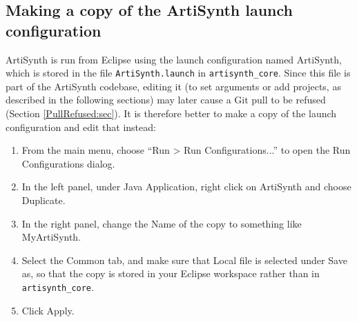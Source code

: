 %
%
%

\subsection{Making a copy of the ArtiSynth launch configuration}
\label{EclipseLaunchCopy}

ArtiSynth is run from Eclipse using the launch configuration named
{\sf ArtiSynth}, which is stored in the file {\tt ArtiSynth.launch}
in {\tt artisynth\_core}. Since this file is part of the ArtiSynth
codebase, editing it (to set arguments or add projects, as described
in the following sections) may later cause a Git pull to be refused
(Section \ref{PullRefused:sec}). It is therefore better to make a copy of
the launch configuration and edit that instead:

\begin{enumerate}

\item From the main menu, choose ``{\sf Run > Run Configurations...}''
to open the {\sf Run Configurations} dialog.

\item In the left panel, under {\sf Java Application}, right click
on {\sf ArtiSynth} and choose {\sf Duplicate}.

\item In the right panel, change the {\sf Name} of the copy to
something like {\sf MyArtiSynth}.

\item Select the {\sf Common} tab, and make sure that {\sf Local
file} is selected under {\sf Save as}, so that the copy is stored in
your Eclipse workspace rather than in {\tt artisynth\_core}.

\item Click {\sf Apply}.

\end{enumerate}

